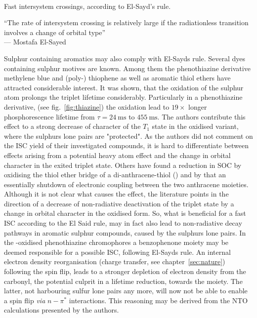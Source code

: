 			\begin{scheme}[h]
				 \\
				\caption{Fast intersystem crossings, according to El-Sayd's rule.}
			\end{scheme}

			``The rate of intersystem crossing is relatively large if the radiationless transition involves a change of orbital type'' \\--- Mostafa El-Sayed%
			
			Sulphur containing aromatics may also comply with El-Sayds rule. Several dyes containing sulphur motives are known. Among them the phenothiazine derivative methylene blue and (poly-) thiophene as well as aromatic thiol ethers have attracted considerable interest. It was shown, that the oxidation of the sulphur atom prolongs the triplet lifetime considerably. Particularly in a phenothiazine derivative, (see fig.~\ref{fig:thiazine}) the oxidation lead to $19 \times$ longer phosphorescence lifetime from $\tau = \qty{24}{\ms}$ to $\qty{455}{\ms}$. The authors contribute this effect to a strong decrease of  character of the $T_1$ state in the oxidised variant, where the sulphurs lone pairs are "protected". As the authors did not comment on the ISC yield of their investigated compounds, it is hard to differentiate between effects arising from a potential heavy atom effect and the change in orbital character in the exited triplet state. Others have found a reduction in SOC by oxidising the thiol ether bridge of a di-anthracene-thiol () and by that an essentially shutdown of electronic coupling between the two anthracene moieties. Although it is not clear what causes the effect, the literature points in the direction of a decrease of non-radiative deactivation of the triplet state by a change in orbital character in the oxidised form. So, what is beneficial for a fast ISC according to the El Said rule, may in fact also lead to non-radiative decay pathways in aromatic sulphur compounds, caused by the sulphurs lone pairs.%
			In the -oxidised phenothiazine chromophores a benzophenone moiety may be deemed responsible for a possible ISC, following El-Sayds rule. An internal electron density reorganisation (charge transfer, see chapter~\ref{sec:nature}) following the spin flip, leads to a stronger depletion of electron density from the carbonyl, the potential culprit in a lifetime reduction, towards the  moiety. The latter, not harbouring sulfur lone pairs any more, will now not be able to enable a spin flip \textit{via} $n-\pi^{\ast}$ interactions. This reasoning may be derived from the NTO calculations presented by the authors.


